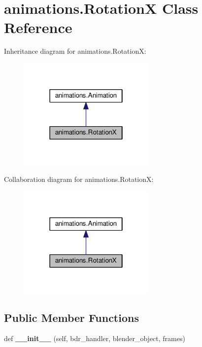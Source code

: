 \hypertarget{classanimations_1_1RotationX}{}\section{animations.\+RotationX Class Reference}
\label{classanimations_1_1RotationX}


Inheritance diagram for animations.\+RotationX\+:\nopagebreak
\begin{figure}[H]
\begin{center}
\leavevmode
\includegraphics[width=190pt]{classanimations_1_1RotationX__inherit__graph}
\end{center}
\end{figure}


Collaboration diagram for animations.\+RotationX\+:\nopagebreak
\begin{figure}[H]
\begin{center}
\leavevmode
\includegraphics[width=190pt]{classanimations_1_1RotationX__coll__graph}
\end{center}
\end{figure}
\subsection*{Public Member Functions}
\begin{DoxyCompactItemize}
\item 
def {\bfseries \+\_\+\+\_\+init\+\_\+\+\_\+} (self, bdr\+\_\+handler, blender\+\_\+object, frames)\hypertarget{classanimations_1_1RotationX_af029701a0cd697e00673d505903dbf7d}{}\label{classanimations_1_1RotationX_af029701a0cd697e00673d505903dbf7d}

\end{DoxyCompactItemize}
